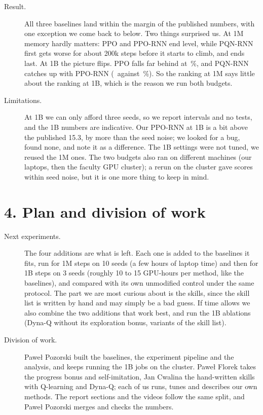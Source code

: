 \documentclass[10pt,a4paper]{article}
\begin{document}
\begin{description}
\item[Result.] All three baselines land within the margin of the published numbers, with one exception we come back to below. Two things surprised us. At 1M memory hardly matters: PPO and PPO-RNN end level, while PQN-RNN first gets worse for about 200k steps before it starts to climb, and ends last. At 1B the picture flips. PPO falls far behind at \scoreOneBPpo\,\%, and PQN-RNN catches up with PPO-RNN (\scoreOneBPqnRnn\ against \scoreOneBPpoRnn\,\%). So the ranking at 1M says little about the ranking at 1B, which is the reason we run both budgets.
\item[Limitations.] At 1B we can only afford three seeds, so we report intervals and no tests, and the 1B numbers are indicative. Our PPO-RNN at 1B is a bit above the published 15.3, by more than the seed noise; we looked for a bug, found none, and note it as a difference. The 1B settings were not tuned, we reused the 1M ones. The two budgets also ran on different machines (our laptops, then the faculty GPU cluster); a rerun on the cluster gave scores within seed noise, but it is one more thing to keep in mind.
\end{description}

\section*{4. Plan and division of work}

\begin{description}
\item[Next experiments.] The four additions are what is left. Each one is added to the baselines it fits, run for 1M steps on 10 seeds (a few hours of laptop time) and then for 1B steps on 3 seeds (roughly 10 to 15 GPU-hours per method, like the baselines), and compared with its own unmodified control under the same protocol. The part we are most curious about is the skills, since the skill list is written by hand and may simply be a bad guess. If time allows we also combine the two additions that work best, and run the 1B ablations (Dyna-Q without its exploration bonus, variants of the skill list).
\item[Division of work.] Pawe{\l} Pozorski built the baselines, the experiment pipeline and the analysis, and keeps running the 1B jobs on the cluster. Pawe{\l} Florek takes the progress bonus and self-imitation, Jan Cwalina the hand-written skills with Q-learning and Dyna-Q; each of us runs, tunes and describes our own methods. The report sections and the videos follow the same split, and Pawe{\l} Pozorski merges and checks the numbers.
\end{description}
\end{document}
